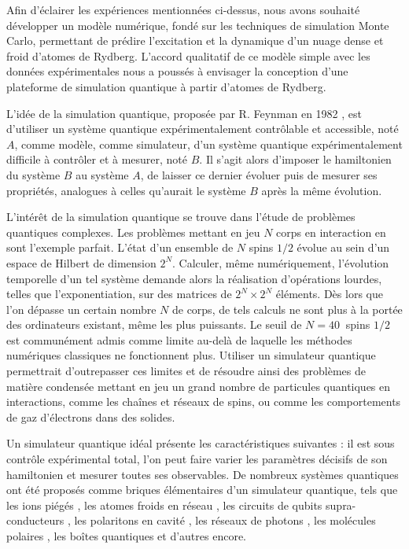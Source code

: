 \bigskip
Afin d'éclairer les expériences mentionnées ci-dessus, nous avons souhaité développer un modèle numérique, fondé sur les techniques de simulation Monte Carlo, permettant de prédire l'excitation et la dynamique d'un nuage dense et froid d'atomes de Rydberg.
L'accord qualitatif de ce modèle simple avec les données expérimentales nous a poussés à envisager la conception d'une plateforme de simulation quantique à partir d'atomes de Rydberg.

L'idée de la simulation quantique, proposée par R. Feynman en 1982 \cite{Feynman1982}, est d'utiliser un système quantique expérimentalement contrôlable et accessible, noté $A$, comme modèle, comme simulateur, d'un système quantique expérimentalement difficile à contrôler et à mesurer, noté $B$.
Il s'agit alors d'imposer le hamiltonien du système $B$ au système $A$, de laisser ce dernier évoluer puis de mesurer ses propriétés, analogues à celles qu'aurait le système $B$ après la même évolution.

L'intérêt de la simulation quantique se trouve dans l'étude de problèmes quantiques complexes.
Les problèmes mettant en jeu $N$ corps en interaction en sont l'exemple parfait.
L'état d'un ensemble de $N$ spins $1/2$ évolue au sein d'un espace de Hilbert de dimension $2^N$.
Calculer, même numériquement, l'évolution temporelle d'un tel système demande alors la réalisation d'opérations lourdes, telles que l'exponentiation, sur des matrices de $2^N \times 2^N$ éléments.
Dès lors que l'on dépasse un certain nombre $N$ de corps, de tels calculs ne sont plus à la portée des ordinateurs existant, même les plus puissants.
Le seuil de $N=\SI{40}{}$ spins $1/2$ est communément admis \cite{Cirac2003,Friedenauer2008,Lloyd1996,Raedt2007} comme limite au-delà de laquelle les méthodes numériques classiques ne fonctionnent plus.
Utiliser un simulateur quantique permettrait d'outrepasser ces limites et de résoudre ainsi des problèmes de matière condensée mettant en jeu un grand nombre de particules quantiques en interactions, comme les chaînes et réseaux de spins, ou comme les comportements de gaz d'électrons dans des solides.

Un simulateur quantique idéal présente les caractéristiques suivantes : il est sous contrôle expérimental total, l'on peut faire varier les paramètres décisifs de son hamiltonien et mesurer toutes ses observables.
De nombreux systèmes quantiques ont été proposés comme briques élémentaires d'un simulateur quantique, tels que les ions piégés \cite{Blatt2012,Schneider2012}, les atomes froids en réseau \cite{Jaksch2005,Lewenstein2007,Bloch2012,Bloch2008}, les circuits de qubits supra-conducteurs \cite{Houck2012}, les polaritons en cavité \cite{Tanese2014}, les réseaux de photons \cite{Aspuru-Guzik2012,Carusotto2013}, les molécules polaires \cite{Buechler2009}, les boîtes  quantiques \cite{Cai2013,Manousakis2002,Byrnes2007} et d'autres encore.


